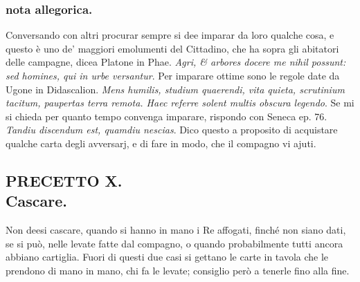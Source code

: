 \documentclass[11pt,a6paper]{article}
\begin{document}
\subsubsection{nota allegorica.}
{\footnotesize
Conversando con altri procurar sempre si dee
imparar da loro qualche cosa, e questo è uno de'
maggiori emolumenti del Cittadino, che ha sopra
gli abitatori delle campagne, dicea Platone in Phae.
\textit{Agri, \& arbores docere me nihil possunt: sed homines,
qui in urbe versantur}. Per imparare ottime
sono le regole date da Ugone in Didascalion. \textit{Mens
humilis, studium quaerendi, vita quieta, scrutinium
tacitum, paupertas terra remota. Haec referre
solent multis obscura legendo}. Se mi si chieda
per quanto tempo convenga imparare, rispondo
con Seneca ep. 76. \textit{Tandiu discendum est, quamdiu
  nescias}. Dico questo a proposito di acquistare
qualche carta degli avversarj, e di fare in modo, che il
compagno vi ajuti. }

\subsection{PRECETTO X.\\
 \footnotesize Cascare.}

Non deesi cascare, quando si hanno in
mano i Re affogati, finché non siano
dati, se si può, nelle levate fatte dal
compagno, o quando probabilmente tutti ancora
abbiano cartiglia. Fuori di questi due casi si
gettano le carte in tavola che le prendono di
mano in mano, chi fa le levate; consiglio però
a tenerle fino alla fine.
\end{document}
